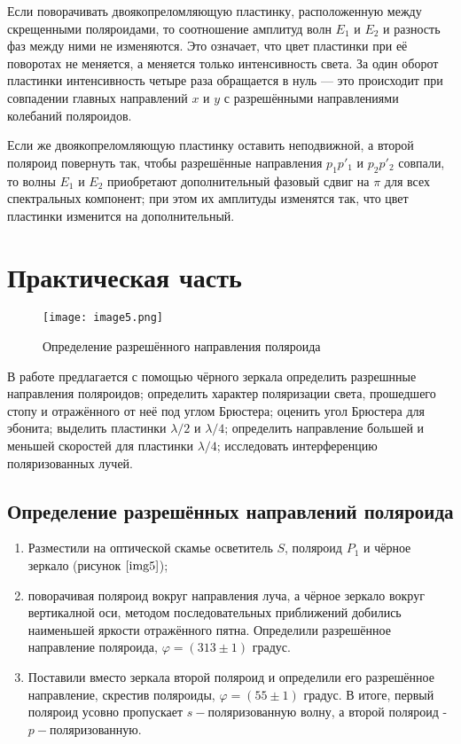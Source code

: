 \documentclass[a4paper,12pt]{article} %
\begin{document}
Если поворачивать двоякопреломляющую пластинку, расположенную между скрещенными поляроидами, то соотношение амплитуд волн $E_1$ и $E_2$ и разность фаз между ними не изменяются. Это означает, что цвет пластинки при её поворотах не меняется, а меняется только интенсивность света. За один оборот пластинки интенсивность четыре раза обращается в нуль --- это происходит при совпадении главных направлений $x$ и $y$ с разрешёнными направлениями колебаний поляроидов.

Если же двоякопреломляющую пластинку оставить неподвижной, а второй поляроид повернуть так, чтобы разрешённые направления $p_1p'_1$ и $p_2p'_2$ совпали, то волны $E_1$ и $E_2$ приобретают дополнительный фазовый сдвиг на $\pi$ для всех спектральных компонент; при этом их амплитуды изменятся так, что цвет пластинки изменится на дополнительный.

\section{Практическая часть}

\begin{wrapfigure}{r}{0.35\linewidth}
    \texttt{[image: image5.png]}
    \caption{Определение разрешённого направления поляроида}
    \label{img5}
\end{wrapfigure}

В работе предлагается с помощью чёрного зеркала определить разрешнные направления поляроидов; определить характер поляризации света, прошедшего стопу  и отражённого от неё под углом Брюстера; оценить угол Брюстера для эбонита; выделить пластинки $\lambda/2$ и $\lambda/4$; определить направление большей и меньшей скоростей для пластинки $\lambda/4$; исследовать интерференцию поляризованных лучей.

\subsection{Определение разрешённых направлений поляроида}

\begin{enumerate}
    \item Разместили на оптической скамье осветитель $S$, поляроид $P_1$ и чёрное зеркало (рисунок $\ref{img5}$);

    \item поворачивая поляроид вокруг направления луча, а чёрное зеркало вокруг вертикалной оси, методом последовательных приближений добились наименьшей яркости отражённого пятна. Определили разрешённое направление поляроида, $\varphi=(313\pm1)$ градус.

    \item Поставили вместо зеркала второй поляроид и определили его разрешённое направление, скрестив поляроиды, $\varphi=(55\pm1)$ градус. В итоге, первый поляроид усовно пропускает $s-$поляризованную волну, а второй поляроид - $p-$поляризованную.
\end{enumerate}
\end{document}
